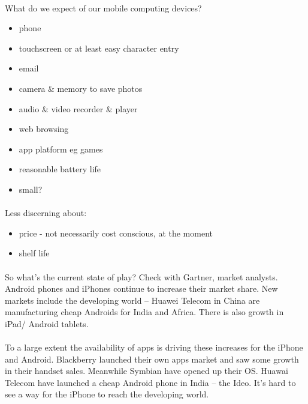\paragraph{} What do we expect of our mobile computing devices?
\begin{itemize}
\item phone
\item touchscreen or at least easy character entry
\item email
\item camera \& memory to save photos
\item audio \& video recorder \& player
\item web browsing
\item app platform eg games
\item reasonable battery life
\item small?
\end{itemize}

\paragraph{} Less discerning about:
\begin{itemize}
\item price - not necessarily cost conscious, at the moment
\item shelf life
\end{itemize}

\paragraph{} So what's the current state of play? Check with Gartner, market analysts. Android phones and iPhones continue to increase their market share.  New markets include the developing world – Huawei Telecom in China are manufacturing cheap Androids for India and Africa. There is also growth in iPad/ Android tablets.
 



 \paragraph{} To a large extent the availability of apps is driving these increases for the iPhone and Android. Blackberry launched their own apps market and saw some growth in their handset sales. Meanwhile Symbian have opened up their OS. Huawai Telecom have launched a cheap Android phone in India – the Ideo. It’s hard to see a way for the iPhone to reach the developing world.


